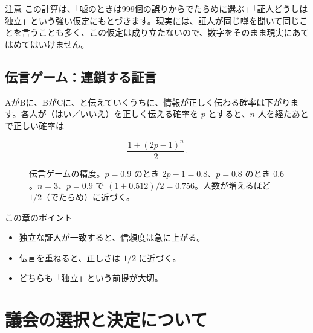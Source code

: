 \documentclass[a4paper,11pt,openany]{ltjsbook}
\begin{document}
\begin{notebox}{注意}
この計算は、「嘘のときは999個の誤りからでたらめに選ぶ」「証人どうしは独立」という強い仮定にもとづきます。現実には、証人が同じ噂を聞いて同じことを言うことも多く、この仮定は成り立たないので、数字をそのまま現実にあてはめてはいけません。
\end{notebox}

\section{伝言ゲーム：連鎖する証言}

AがBに、BがCに、と伝えていくうちに、情報が正しく伝わる確率は下がります。各人が（はい／いいえ）を正しく伝える確率を $p$ とすると、$n$ 人を経たあとで正しい確率は

\[
\frac{1+(2p-1)^n}{2}.
\]

\begin{figure}[htbp]
\centering
{}
\caption{伝言ゲームの精度。$p=0.9$ のとき $2p-1=0.8$、$p=0.8$ のとき $0.6$。$n=3$、$p=0.9$ で $(1+0.512)/2=0.756$。人数が増えるほど $1/2$（でたらめ）に近づく。}
\end{figure}

\begin{pointbox}{この章のポイント}
\begin{itemize}[leftmargin=1.5em]
\item 独立な証人が一致すると、信頼度は急に上がる。
\item 伝言を重ねると、正しさは $1/2$ に近づく。
\item どちらも「独立」という前提が大切。
\end{itemize}
\end{pointbox}

\chapter{議会の選択と決定について}
\end{document}
